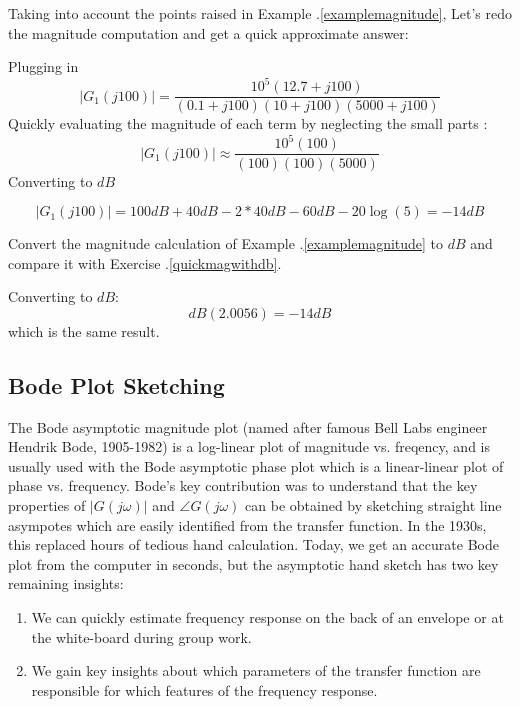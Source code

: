 \begin{ExampleSmall}\label{quickmagwithdb}
Taking into account the points raised in Example \thechapter.\ref{examplemagnitude}, Let's redo the magnitude computation and get a quick approximate answer:


Plugging in
\[
|G_1(j100)| = \frac {10^5(12.7 + j100)}     {(0.1+j100)(10+j100)(5000+j100)}
\]
Quickly evaluating the magnitude of each term by neglecting the small parts :
\[
|G_1(j100)| \approx \frac {10^5(100)}     {(100)(100)(5000)}
\]
Converting to $dB$


\[
|G_1(j100)| = 100dB + 40dB - 2*40dB - 60dB - 20\log(5) = -14dB
\]


\end{ExampleSmall}


\begin{ExampleSmall}
Convert the magnitude calculation of Example \thechapter.\ref{examplemagnitude} to $dB$ and compare it with Exercise \thechapter.\ref{quickmagwithdb}.


Converting to $dB$:
\[
dB(2.0056) = -14dB
\]
which is the same result.
\end{ExampleSmall}

\subsection{Bode Plot Sketching}\label{BodePlotAsymptoticApprox}

The Bode asymptotic magnitude plot (named after famous Bell Labs engineer Hendrik Bode, 1905-1982)
is a log-linear plot of magnitude vs. freqency, and is usually used with the Bode asymptotic phase plot which is a linear-linear plot of phase vs. frequency.  Bode's key contribution was to understand that the key properties of $|G(j\omega)|$ and $\angle G(j\omega)$ can be obtained by sketching straight line asympotes which are easily identified from the transfer function.   In the 1930s, this replaced hours of tedious hand calculation.   Today, we get an accurate Bode plot from the computer in seconds, but the asymptotic hand sketch has two key remaining insights:


\begin{enumerate}
  \item  We can quickly estimate frequency response on the back of an envelope or at the white-board during group work.
  \item  We gain key insights about which parameters of the transfer function are responsible for which features of the frequency response.
\end{enumerate}


